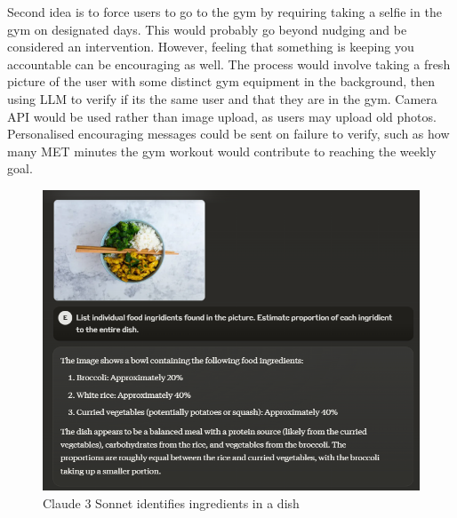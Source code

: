 Second idea is to force users to go to the gym by requiring taking a selfie in the gym on designated days. This would probably go beyond nudging and be considered an intervention. However, feeling that something is keeping you accountable can be encouraging as well. The process would involve taking a fresh picture of the user with some distinct gym equipment in the background, then using LLM to verify if its the same user and that they are in the gym. Camera API would be used rather than image upload, as users may upload old photos. Personalised encouraging messages could be sent on failure to verify, such as how many MET minutes the gym workout would contribute to reaching the weekly goal. 
\begin{figure}
    
    \centering
    \includegraphics[width=1\textwidth,keepaspectratio]{../images/sonnet_vision.png}
    \caption{Claude 3 Sonnet identifies ingredients in a dish}
    \label{fig:sonnetV1}
    
\end{figure}
